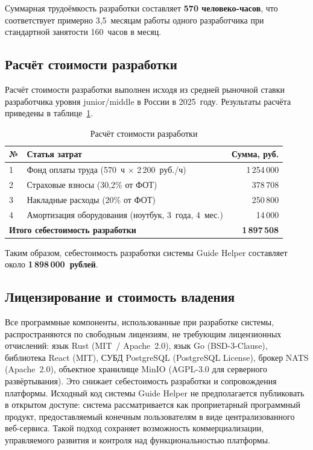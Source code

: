 Суммарная трудоёмкость разработки составляет \textbf{570 человеко-часов}, что
соответствует примерно 3,5~месяцам работы одного разработчика при стандартной
занятости 160~часов в месяц.

\subsection{Расчёт стоимости разработки}

Расчёт стоимости разработки выполнен исходя из средней рыночной ставки разработчика
уровня junior/middle в России в 2025~году. Результаты расчёта приведены в
таблице~\ref{tab:cost}.

\begin{table}[H]
\caption{Расчёт стоимости разработки}
\label{tab:cost}
\begin{tabularx}{\textwidth}{|l|X|r|}
\hline
\textbf{№} & \textbf{Статья затрат} & \textbf{Сумма, руб.} \\
\hline
1 & Фонд оплаты труда (570~ч $\times$ 2\,200~руб./ч) & 1\,254\,000 \\
\hline
2 & Страховые взносы (30,2\% от ФОТ) & 378\,708 \\
\hline
3 & Накладные расходы (20\% от ФОТ) & 250\,800 \\
\hline
4 & Амортизация оборудования (ноутбук, 3~года, 4~мес.) & 14\,000 \\
\hline
\multicolumn{2}{|l|}{\textbf{Итого себестоимость разработки}} & \textbf{1\,897\,508} \\
\hline
\end{tabularx}
\end{table}

Таким образом, себестоимость разработки системы Guide Helper составляет
около \textbf{1\,898\,000~рублей}.

\subsection{Лицензирование и стоимость владения}

Все программные компоненты, использованные при разработке системы, распространяются
по свободным лицензиям, не требующим лицензионных отчислений: язык Rust
(MIT~/ Apache~2.0), язык Go (BSD-3-Clause), библиотека React (MIT), СУБД
PostgreSQL (PostgreSQL License), брокер NATS (Apache~2.0), объектное хранилище
MinIO (AGPL-3.0 для серверного развёртывания). Это снижает себестоимость
разработки и сопровождения платформы. Исходный код системы Guide Helper не
предполагается публиковать в открытом доступе: система рассматривается как
проприетарный программный продукт, предоставляемый конечным пользователям в виде
централизованного веб-сервиса. Такой подход сохраняет возможность коммерциализации,
управляемого развития и контроля над функциональностью платформы.

